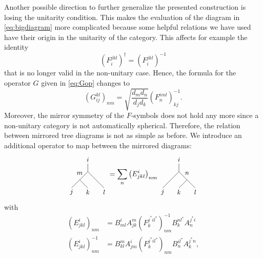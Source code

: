 Another possible direction to further generalize the presented construction is losing the unitarity condition. This makes the evaluation of the diagram in \cref{eq:bigdiagram} more complicated because some helpful relations we have used have their origin in the unitarity of the category. This affects for example the identity
	\begin{equation}
		\left(F_i^{jkl}\right)^\dagger=\left(F_i^{jkl}\right)^{-1}
	\end{equation}
that is no longer valid in the non-unitary case. Hence, the formula for the operator $G$ given in \cref{eq:Gop} changes to
	\begin{equation}
		\left(G_{ij}^{kl}\right)_{nm}=\sqrt{\frac{d_md_n}{d_jd_k}}\left(F_n^{iml}\right)_{kj}^{-1}.
	\end{equation}
Moreover, the mirror symmetry of the $F$-symbols does not hold any more since a non-unitary category is not automatically spherical. Therefore, the relation between mirrored tree diagrams is not as simple as before. We introduce an additional operator to map between the mirrored diagrams:
	\begin{equation}
		\begin{tikzpicture}[baseline=(current bounding box.center),xscale=0.8,yscale=-0.8]
			\draw (0,0.5) -- (0,1);
			\draw (0,1) -- (-0.5,1.5);
			\draw (-0.5,1.5) -- (-1,2);
			\draw (-0.5,1.5) -- (0,2);
			\draw (0,1) -- (0.5,1.5);
			\draw (0.5,1.5) -- (1,2);
			\node at (0,0.25) {\small $i$};
			\node at (-1,2.25) {\small $j$};
			\node at (0,2.25) {\small $k$};
			\node at (1,2.25) {\small $l$};
			\node at (-0.5,1.1) {\small $m$};
		\end{tikzpicture}=\sum_n\left(E^{i}_{jkl}\right)_{nm}
		\begin{tikzpicture}[baseline=(current bounding box.center),xscale=0.8,yscale=-0.8]
			\draw (0,0.5) -- (0,1);
			\draw (0,1) -- (-0.5,1.5);
			\draw (-0.5,1.5) -- (-1,2);
			\draw (0.5,1.5) -- (0,2);
			\draw (0,1) -- (0.5,1.5);
			\draw (0.5,1.5) -- (1,2);
			\node at (0,0.25) {\small $i$};
			\node at (-1,2.25) {\small $j$};
			\node at (0,2.25) {\small $k$};
			\node at (1,2.25) {\small $l$};
			\node at (0.5,1.1) {\small $n$};
		\end{tikzpicture}
	\end{equation}
with 
	\begin{align}
		\left(E^{i}_{jkl}\right)_{nm}&=B_{ml}^i A_{jk}^m\left(F_k^{j^*il^*}\right)_{nm}^{-1} B_k^{nl^*}A_n^{j^*i}\\
		\left(E^{i}_{jkl}\right)_{nm}^{-1}&=B_{kl}^m A_{jm}^i \left(F_k^{j^*il^*}\right)_{nm} B_n^{il^*} A_k^{j^*n},
	\end{align}

